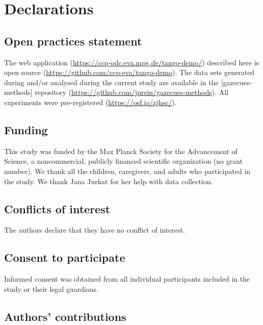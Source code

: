 \documentclass[
  man,floatsintext]{apa6}
\begin{document}
\newpage

\hypertarget{declarations}{%
\section{Declarations}\label{declarations}}

\hypertarget{open-practices-statement}{%
\subsection{Open practices statement}\label{open-practices-statement}}

The web application (\url{https://ccp-odc.eva.mpg.de/tango-demo/}) described here is open source (\url{https://github.com/ccp-eva/tango-demo}).
The data sets generated during and/or analysed during the current study are available in the {[}gazecues-methods{]} repository (\url{https://github.com/jprein/gazecues-methods}).
All experiments were pre-registered (\url{https://osf.io/zjhsc/}).

\hypertarget{funding}{%
\subsection{Funding}\label{funding}}

This study was funded by the Max Planck Society for the Advancement of Science, a noncommercial, publicly financed scientific organization (no grant number).
We thank all the children, caregivers, and adults who participated in the study.
We thank Jana Jurkat for her help with data collection.

\hypertarget{conflicts-of-interest}{%
\subsection{Conflicts of interest}\label{conflicts-of-interest}}

The authors declare that they have no conflict of interest.

\hypertarget{consent-to-participate}{%
\subsection{Consent to participate}\label{consent-to-participate}}

Informed consent was obtained from all individual participants included in the study or their legal guardians.

\hypertarget{authors-contributions}{%
\subsection{Authors' contributions}\label{authors-contributions}}
\end{document}
